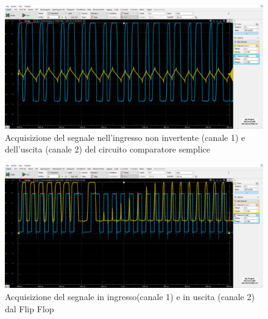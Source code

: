 \documentclass[10pt, a4paper, italian]{article}
\begin{document}
\begin{figure}[htbp]
    \centering
	\includegraphics[width=\textwidth]{MIDDLE.U2.InputVSOutput}
    \caption{Acquisizione del segnale nell'ingresso non invertente (canale 1) e dell'uscita (canale 2) del circuito comparatore semplice}
\end{figure}
\begin{figure}[htbp]
    \centering
	\includegraphics[width=\textwidth]{MIDDLE.U3.InputVSOutput}
    \caption{Acquisizione del segnale in ingresso(canale 1) e in uscita (canale 2) dal Flip Flop}
\end{figure}
\end{document}
